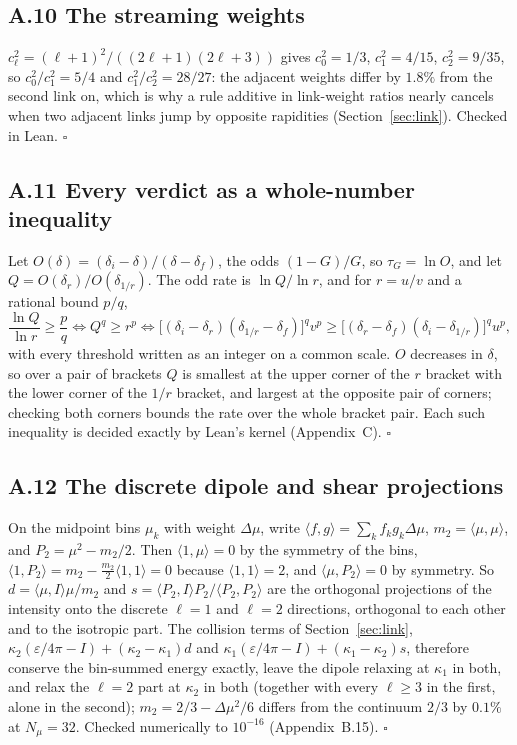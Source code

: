 \documentclass[11pt]{article}
\begin{document}
\subsection*{A.10 The streaming weights}
$c_\ell^2=(\ell+1)^2/((2\ell+1)(2\ell+3))$ gives $c_0^2=1/3$, $c_1^2=4/15$, $c_2^2=9/35$, so $c_0^2/c_1^2=5/4$ and $c_1^2/c_2^2=28/27$: the adjacent weights differ by $1.8\%$ from the second link on, which is why a rule additive in link-weight ratios nearly cancels when two adjacent links jump by opposite rapidities (Section~\ref{sec:link}). Checked in Lean. $\square$

\subsection*{A.11 Every verdict as a whole-number inequality}
Let $O(\delta)=(\delta_i-\delta)/(\delta-\delta_f)$, the odds $(1-G)/G$, so $\tau_G=\ln O$, and let $Q=O(\delta_r)/O(\delta_{1/r})$. The odd rate is $\ln Q/\ln r$, and for $r=u/v$ and a rational bound $p/q$,
\[
\frac{\ln Q}{\ln r}\ge\frac pq\iff Q^q\ge r^p\iff \big[(\delta_i-\delta_r)(\delta_{1/r}-\delta_f)\big]^q v^p\ge\big[(\delta_r-\delta_f)(\delta_i-\delta_{1/r})\big]^q u^p ,
\]
with every threshold written as an integer on a common scale. $O$ decreases in $\delta$, so over a pair of brackets $Q$ is smallest at the upper corner of the $r$ bracket with the lower corner of the $1/r$ bracket, and largest at the opposite pair of corners; checking both corners bounds the rate over the whole bracket pair. Each such inequality is decided exactly by Lean's kernel (Appendix~C). $\square$

\subsection*{A.12 The discrete dipole and shear projections}
On the midpoint bins $\mu_k$ with weight $\Delta\mu$, write $\langle f,g\rangle=\sum_kf_kg_k\Delta\mu$, $m_2=\langle\mu,\mu\rangle$, and $P_2=\mu^2-m_2/2$. Then $\langle1,\mu\rangle=0$ by the symmetry of the bins, $\langle1,P_2\rangle=m_2-\tfrac{m_2}{2}\langle1,1\rangle=0$ because $\langle1,1\rangle=2$, and $\langle\mu,P_2\rangle=0$ by symmetry. So $d=\langle\mu,I\rangle\mu/m_2$ and $s=\langle P_2,I\rangle P_2/\langle P_2,P_2\rangle$ are the orthogonal projections of the intensity onto the discrete $\ell=1$ and $\ell=2$ directions, orthogonal to each other and to the isotropic part. The collision terms of Section~\ref{sec:link}, $\kappa_2(\varepsilon/4\pi-I)+(\kappa_2-\kappa_1)d$ and $\kappa_1(\varepsilon/4\pi-I)+(\kappa_1-\kappa_2)s$, therefore conserve the bin-summed energy exactly, leave the dipole relaxing at $\kappa_1$ in both, and relax the $\ell=2$ part at $\kappa_2$ in both (together with every $\ell\ge3$ in the first, alone in the second); $m_2=2/3-\Delta\mu^2/6$ differs from the continuum $2/3$ by $0.1\%$ at $N_\mu=32$. Checked numerically to $10^{-16}$ (Appendix~B.15). $\square$
\end{document}
